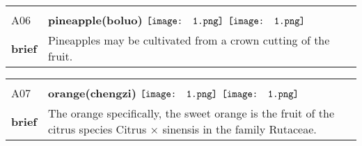 \documentclass[UTF8]{article}
\begin{document}
            \begin{tabularx}{\textwidth}{p{1.5cm}X}
            \arrayrulecolor{myBlue}
        	\hline\\
            \small{A06}&
            \large{\bfseries{pineapple(boluo)}}\hfill
                                                            $\vcenter{\hbox{\texttt{[image: 1.png]}}}$
                                                                \phantom{$\vcenter{\hbox{\texttt{[image: 1.png]}}}$}
                                                                \phantom{$\vcenter{\hbox{\texttt{[image: 1.png]}}}$}
                                                                $\vcenter{\hbox{\texttt{[image: 1.png]}}}$
                                                                \phantom{$\vcenter{\hbox{\texttt{[image: 1.png]}}}$}
                                                                \phantom{$\vcenter{\hbox{\texttt{[image: 1.png]}}}$}
                                                                \phantom{$\vcenter{\hbox{\texttt{[image: 1.png]}}}$}
                                        \\[10pt]
            \large{\bfseries{brief}}&\noindent\parbox[c]{\hsize}{Pineapples may be cultivated from a crown cutting of the fruit.} \\[5pt]
            \hline\\[-10pt]
        \end{tabularx}
            \begin{tabularx}{\textwidth}{p{1.5cm}X}
            \arrayrulecolor{myBlue}
        	\hline\\
            \small{A07}&
            \large{\bfseries{orange(chengzi)}}\hfill
                                                            $\vcenter{\hbox{\texttt{[image: 1.png]}}}$
                                                                \phantom{$\vcenter{\hbox{\texttt{[image: 1.png]}}}$}
                                                                \phantom{$\vcenter{\hbox{\texttt{[image: 1.png]}}}$}
                                                                \phantom{$\vcenter{\hbox{\texttt{[image: 1.png]}}}$}
                                                                $\vcenter{\hbox{\texttt{[image: 1.png]}}}$
                                                                \phantom{$\vcenter{\hbox{\texttt{[image: 1.png]}}}$}
                                                                \phantom{$\vcenter{\hbox{\texttt{[image: 1.png]}}}$}
                                        \\[10pt]
            \large{\bfseries{brief}}&\noindent\parbox[c]{\hsize}{The orange specifically, the sweet orange is the fruit of the citrus species Citrus × sinensis in the family Rutaceae.} \\[5pt]
            \hline\\[-10pt]
        \end{tabularx}
\end{document}
